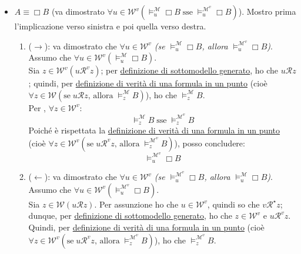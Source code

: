 \documentclass[a4paper,12pt]{article}
\newcommand{\latinmodern}[1]{\text{#1}}
\newcommand{\latinmath}[1]{\text{\latinmodern{#1}}} %
\begin{document}
\begin{dimo}
\begin{description}
\begin{itemize}
			      \item $A \equiv \Box B$ (va dimostrato \emph{$\forall u \in \mathcal{W}^{v} (\vDash_u^{\mathcal{M}} \Box B \; \text{sse} \; \vDash_u^{\mathcal{M}^{v}} \Box B)$}). Mostro prima l'implicazione verso sinistra e poi quella verso destra.
			            \begin{enumerate}
				            \item ($\to$): va dimostrato che \emph{$\forall u \in \mathcal{W}^{v}$ (se $\vDash_u^{\mathcal{M}} \Box B$, allora $\vDash_u^{\mathcal{M}^{v}} \Box B$)}. \\
				                  Assumo che $\forall u \in \mathcal{W}^{v} (\vDash_u^{\mathcal{M}} \Box B)$. \\
				                  Sia $z \in \mathcal{W}^{v} (u\mathcal{R}^{v}z)$; per \hyperlink{modgen}{definizione di sottomodello generato}, ho che $u\mathcal{R}z$; quindi, per \hyperlink{defverp}{definizione di verità di una formula in un punto} (cioè $\forall z \in \mathcal{W} (\text{se} \; u\mathcal{R}z \text{, allora} \; \vDash_z^{\mathcal{M}} B)$), ho che $\vDash_z^{\mathcal{M}} B$. \\
				                  Per \latinmath{IH1}, $\forall z \in \mathcal{W}^{v}$:
				                  $$\vDash_z^{\mathcal{M}} B\; \text{sse} \; \vDash_z^{\mathcal{M}^{v}} B$$
				                  Poiché è rispettata la \hyperlink{defverp}{definizione di verità di una formula in un punto} (cioè $\forall z \in \mathcal{W}^v (\text{se} \; u\mathcal{R}^vz \text{, allora} \; \vDash_z^{\mathcal{M}^v} B)$), posso concludere:
				                  $$\vDash_u^{\mathcal{M}^{v}} \Box B$$
				            \item ($\leftarrow$): va dimostrato che \emph{$\forall u \in \mathcal{W}^{v}$ (se $\vDash_u^{\mathcal{M}^{v}} \Box B$, allora $\vDash_u^{\mathcal{M}} \Box B$)}. \\
				                  Assumo che $\forall u \in \mathcal{W}^{v} (\vDash_u^{\mathcal{M}^{v}} \Box B)$. \\
				                  Sia $z \in \mathcal{W} (u\mathcal{R}z)$. Per assunzione ho che $u \in \mathcal{W}^{v}$, quindi so che $v\mathcal{R}^{\star}z$; dunque, per \hyperlink{modgen}{definizione di sottomodello generato}, ho che $z \in \mathcal{W}^{v}$ e $u\mathcal{R}^{v}z$. \\
				                  Quindi, per \hyperlink{defverp}{definizione di verità di una formula in un punto} (cioè $\forall z \in \mathcal{W}^{v} (\text{se} \; u\mathcal{R}^{v}z \text{, allora} \; \vDash_z^{\mathcal{M}^{v}} B)$), ho che $\vDash_z^{\mathcal{M}^{v}} B$. \\

\end{enumerate}
\end{itemize}
\end{description}
\end{dimo}
\end{document}
